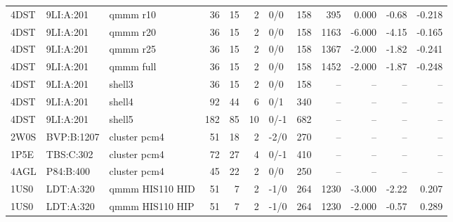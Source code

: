 {\begin{longtable}{lllrrrlrrrrr}
4DST & 9LI:A:201 & qmmm r10 & 36 & 15 & 2 & 0/0 & 158 & 395 & 0.000 & -0.68 & -0.218\\
4DST & 9LI:A:201 & qmmm r20 & 36 & 15 & 2 & 0/0 & 158 & 1163 & -6.000 & -4.15 & -0.165\\
4DST & 9LI:A:201 & qmmm r25 & 36 & 15 & 2 & 0/0 & 158 & 1367 & -2.000 & -1.82 & -0.241\\
4DST & 9LI:A:201 & qmmm full & 36 & 15 & 2 & 0/0 & 158 & 1452 & -2.000 & -1.87 & -0.248\\
4DST & 9LI:A:201 & shell3 & 36 & 15 & 2 & 0/0 & 158 & -- & -- & -- & --\\
4DST & 9LI:A:201 & shell4 & 92 & 44 & 6 & 0/1 & 340 & -- & -- & -- & --\\
4DST & 9LI:A:201 & shell5 & 182 & 85 & 10 & 0/-1 & 682 & -- & -- & -- & --\\
2W0S & BVP:B:1207 & cluster pcm4 & 51 & 18 & 2 & -2/0 & 270 & -- & -- & -- & --\\
1P5E & TBS:C:302 & cluster pcm4 & 72 & 27 & 4 & 0/-1 & 410 & -- & -- & -- & --\\
4AGL & P84:B:400 & cluster pcm4 & 45 & 22 & 2 & 0/0 & 250 & -- & -- & -- & --\\
1US0 & LDT:A:320 & qmmm HIS110 HID & 51 & 7 & 2 & -1/0 & 264 & 1230 & -3.000 & -2.22 & 0.207\\
1US0 & LDT:A:320 & qmmm HIS110 HIP & 51 & 7 & 2 & -1/0 & 264 & 1230 & -2.000 & -0.57 & 0.289\\
\end{longtable}}
